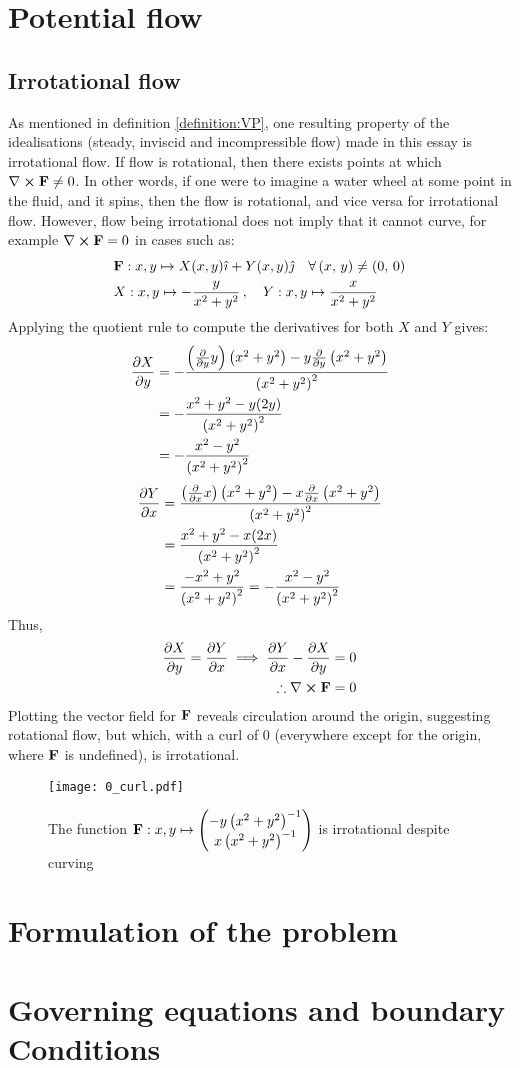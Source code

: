 \section{Potential flow}
\subsection{Irrotational flow}\label{section:IRROTATIONAL}
As mentioned in definition \ref{definition:VP}, one resulting property of the idealisations (steady, inviscid and incompressible flow)
made in this essay is irrotational flow. If flow is rotational, then there exists points at which $\curl{\fatf}\neq0$. In other words, if one were to
imagine a water wheel at some point in the fluid, and it spins, then the flow is rotational, and vice versa for irrotational flow.
However, flow being irrotational does not imply that it cannot curve, for example $\curl{\fatf}=0$ in cases such as:
\begin{align*}
    &\mathbf{F}:x,y\mapsto X(x,y)\hat{\imath}+Y(x,y)\hat{\jmath}\quad\forall\left(x,\,y\right)\neq\left(0,\,0\right)\\
    &X:x,y\mapsto-\frac{y}{x^2+y^2}\,,\quad Y:x,y\mapsto\frac{x}{x^2+y^2}
\end{align*}
Applying the quotient rule to compute the derivatives for both $X$ and $Y$ gives:
\begin{align*}
    \pdv{X}{y}&=-\frac{\left(\pdv{y}y\right)\left(x^2+y^2\right)-y\pdv{y}\left(x^2+y^2\right)}{\left(x^2+y^2\right)^2}\\
    &=-\frac{x^2+y^2-y(2y)}{\left(x^2+y^2\right)^2}\\
    &=-\frac{x^2-y^2}{\left(x^2+y^2\right)^2}
\end{align*}
\begin{align*}
    \pdv{Y}{x}&=\frac{\left(\pdv{x}x\right)\left(x^2+y^2\right)-x\pdv{x}\left(x^2+y^2\right)}{\left(x^2+y^2\right)^2}\\
    &=\frac{x^2+y^2-x(2x)}{\left(x^2+y^2\right)^2}\\
    &=\frac{-x^2+y^2}{\left(x^2+y^2\right)^2}=-\frac{x^2-y^2}{\left(x^2+y^2\right)^2}
\end{align*}
Thus,
\begin{align*}
    \pdv{X}{y}=\pdv{Y}{x}\implies\pdv{Y}{x}-\pdv{X}{y}=0\\
    \therefore\curl{\fatf}=0
\end{align*}
Plotting the vector field for $\mathbf{F}$ reveals circulation around the origin, suggesting rotational flow, but which, with a curl of 0 (everywhere except for
the origin, where $\mathbf{F}$ is undefined), is irrotational.
\begin{figure*}[!ht]
    \texttt{[image: 0\_curl.pdf]}
    \centering
    \caption{The function $\mathbf{F}:x,y\mapsto\begin{pmatrix}
        -y\left(x^2+y^2\right)^{-1}\\x\left(x^2+y^2\right)^{-1}
    \end{pmatrix}$ is irrotational despite curving}
    \label{figure:ZEROCURL}
\end{figure*}

\section{Formulation of the problem}
\section{Governing equations and boundary Conditions}